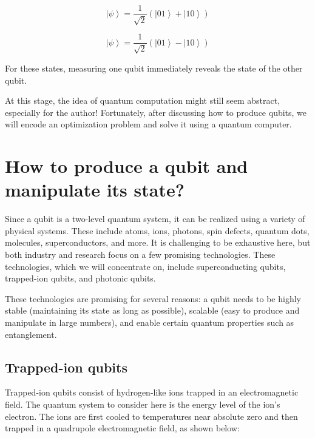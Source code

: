 \documentclass{article}
\begin{document}
\begin{multicols}{2}
\begin{equation}
    \left|\psi\right> = \frac{1}{\sqrt{2}}\left(\left|01\right> + \left|10\right>\right)
\end{equation}

\begin{equation}
    \left|\psi\right> = \frac{1}{\sqrt{2}}\left(\left|01\right> - \left|10\right>\right)
\end{equation}

For these states, measuring one qubit immediately reveals the state of the other qubit. 

At this stage, the idea of quantum computation might still seem abstract, especially for the author! Fortunately, after discussing how to produce qubits, we will encode an optimization problem and solve it using a quantum computer.

\section{How to produce a qubit and manipulate its state?}

Since a qubit is a two-level quantum system, it can be realized using a variety of physical systems. These include atoms, ions, photons, spin defects, quantum dots, molecules, superconductors, and more. It is challenging to be exhaustive here, but both industry and research focus on a few promising technologies. These technologies, which we will concentrate on, include superconducting qubits, trapped-ion qubits, and photonic qubits. 

These technologies are promising for several reasons: a qubit needs to be highly stable (maintaining its state as long as possible), scalable (easy to produce and manipulate in large numbers), and enable certain quantum properties such as entanglement.

\subsection{Trapped-ion qubits}

Trapped-ion qubits consist of hydrogen-like ions trapped in an electromagnetic field. The quantum system to consider here is the energy level of the ion’s electron. The ions are first cooled to temperatures near absolute zero and then trapped in a quadrupole electromagnetic field, as shown below:


\end{multicols}
\end{document}

